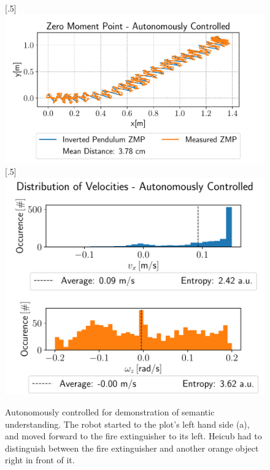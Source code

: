 \begin{figure}[h!]
	[.5\linewidth]{\includegraphics[scale=.45]{chapters/04_experiments/02_autonomous_walking/semantic_walk_01_zmp.pdf}}
	[.5\linewidth]{\includegraphics[scale=.45]{chapters/04_experiments/02_autonomous_walking/semantic_walk_01_entropy.pdf}}
	\caption{Autonomously controlled for demonstration of semantic understanding. The robot started to the plot's left hand side (a), and moved forward to the fire extinguisher to its left. Heicub had to distinguish between the fire extinguisher and another orange object right in front of it.}
	\label{fig::424_aw_additional_semantic}
\end{figure}
\FloatBarrier
